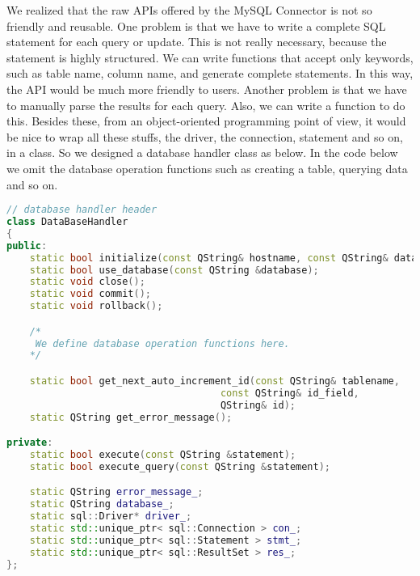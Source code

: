 We realized that the raw APIs offered by the MySQL Connector is not so friendly and reusable. One problem is that we have to write a complete SQL statement for each query or update. This is not really necessary, because the statement is highly structured. We can write functions that accept only keywords, such as table name, column name, and generate complete statements. In this way, the API would be much more friendly to users. Another problem is that we have to manually parse the results for each query. Also, we can write a function to do this. Besides these, from an object-oriented programming point of view, it would be nice to wrap all these stuffs, the driver, the connection, statement and so on, in a class. So we designed a database handler class as below. In the code below we omit the database operation functions such as creating a table, querying data and so on.

\begin{lstlisting}[language=C++]
// database handler header
class DataBaseHandler
{
public:
    static bool initialize(const QString& hostname, const QString& database, const QString& username, const QString& password);
    static bool use_database(const QString &database);
    static void close();
    static void commit();
    static void rollback();

    /*
     We define database operation functions here.
    */

    static bool get_next_auto_increment_id(const QString& tablename, 
                                     const QString& id_field, 
                                     QString& id);
    static QString get_error_message();

private:
    static bool execute(const QString &statement);
    static bool execute_query(const QString &statement);

    static QString error_message_;
    static QString database_;
    static sql::Driver* driver_;
    static std::unique_ptr< sql::Connection > con_;
    static std::unique_ptr< sql::Statement > stmt_;
    static std::unique_ptr< sql::ResultSet > res_;
};
\end{lstlisting}


